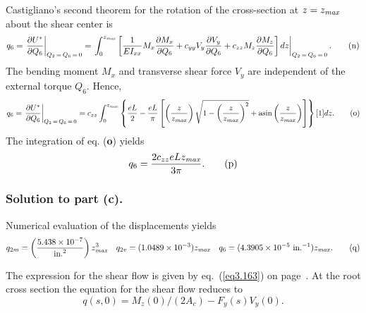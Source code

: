 \documentclass{AeroStructure-ERJohnson}
\begin{document}
\begin{example*}
Castigliano's second theorem for the rotation of the cross-section at $z=z_{\it max}$ about the shear center is
\begin{equation*}
q_{6}=\left.\frac{\partial U^{*}}{\partial Q_{6}}\right|_{Q_{2}\,=\,Q_{6}\,=\,0}=\left.\int_{0}^{z_{\it max }}\left[\frac{1}{E I_{x x}} M_{x} \frac{\partial M_{x}}{\partial Q_{6}}+c_{y y} V_{y} \frac{\partial V_{y}}{\partial Q_{6}}+c_{z z} M_{z} \frac{\partial M_{z}}{\partial Q_{6}}\right] d z\right|_{Q_{2}\,=\,Q_{6}\,=\,0}.\tag{n}
\end{equation*}
The bending moment $M_x$ and transverse shear force $V_y$ are independent of the external torque $Q_6$. Hence,
\begin{equation*}
q_{6}=\left.\frac{\partial U^{*}}{\partial Q_{6}}\right|_{Q_{2}\,=\,Q_{6}\,=\,0}=c_{z z} \int_{0}^{z_{\it max }}\left\{\frac{e L}{2}-\frac{e L}{\pi}\left[\left(\frac{z}{z_{\it max }}\right) \sqrt{1-\left(\frac{z}{z_{\it max }}\right)^{2}}+\operatorname{asin}\left(\frac{z}{z_{\it max }}\right)\right]\right\}[1] d z.\tag{o}
\end{equation*}
The integration of eq. (\textbf{o}) yields
\begin{equation*}
q_{6}=\frac{2 c_{z z} e L z_{\it max }}{3 \pi}.\tag{p}
\end{equation*}

\subsubsection{Solution to part (c).} Numerical evaluation of the displacements yields
\begin{equation*}
q_{2 m}=\left(\frac{5.438 \times 10^{-7}}{\text {in.}^{2}}\right) z_{\it max}^{3} \quad q_{2 v}=(1.0489 \times 10^{-3}) z_{\it max } \quad q_{6}=(4.3905 \times 10^{-5} \text { in.}^{-1}) z_{\it max}.\tag{q}
\end{equation*}

\vspace*{-1pc}

The expression for the shear flow is given by eq.~(\ref{eq3.163}) on page~\pageref{eq3.163}. At the root cross section the equation for the shear flow reduces to
\begin{equation*}
q(s, 0)=M_{z}(0) /\left(2 A_{c}\right)-F_{y}(s) V_{y}(0).\tag{r}
\end{equation*}

\vspace*{-1pc}\pagebreak


\end{example*}
\end{document}

